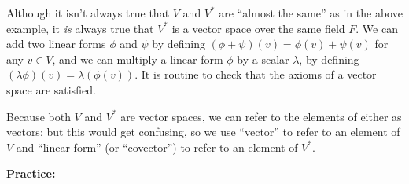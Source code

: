 \documentclass{article}
\begin{document}
Although it isn't always true that $V$ and $V^*$ are ``almost the same'' as in the above example, it \textit{is} always true that $V^*$ is a vector space over the same field $F$. We can add two linear forms $\phi$ and $\psi$ by defining $(\phi+\psi)(v)=\phi(v)+\psi(v)$ for any $v\in V$, and we can multiply a linear form $\phi$ by a scalar $\lambda$, by defining $(\lambda\phi)(v)=\lambda(\phi(v))$. It is routine to check that the axioms of a vector space are satisfied.

Because both $V$ and $V^*$ are vector spaces, we can refer to the elements of either as vectors; but this would get confusing, so we use ``vector'' to refer to an element of $V$ and ``linear form'' (or ``covector'') to refer to an element of $V^*$.


\clearpage










\textbf{Practice:}\bigskip
\end{document}
